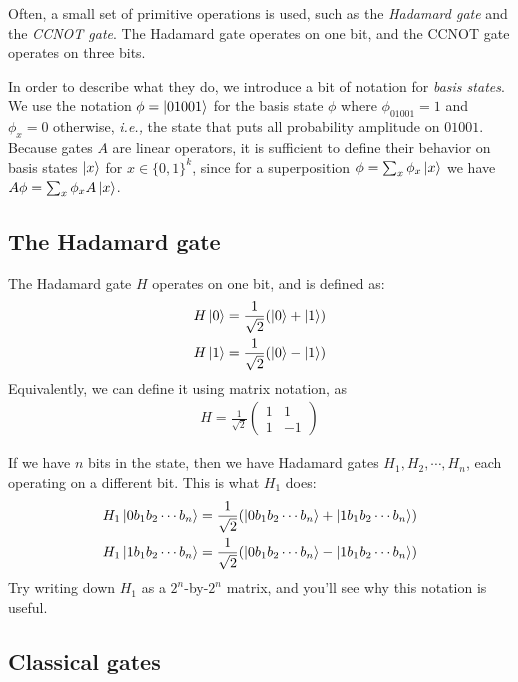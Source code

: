\documentclass[a4paper, 11pt]{article}
\theoremstyle{definition}
\newcommand{\ie}{\textit{i.e.,}\xspace}
\begin{document}
Often, a small set of primitive operations is used, such as the \emph{Hadamard gate} and the \emph{CCNOT gate}.
The Hadamard gate operates on one bit, and the CCNOT gate operates on three bits.

In order to describe what they do, we introduce a bit of notation for \emph{basis states}.
We use the notation $\phi = \ket{01001}$ for the basis state $\phi$ where $\phi_{01001} = 1$ and $\phi_x = 0$ otherwise, \ie the state that puts all probability amplitude on $01001$.
Because gates $A$ are linear operators, it is sufficient to define their behavior on basis states $\ket{x}$ for $x \in \{0,1\}^k$,
since for a superposition $\phi = \sum_x \phi_x \ket{x}$ we have $A\phi = \sum_x \phi_x A \ket{x}$.

\subsection{The Hadamard gate}

\newcommand{\Ha}{H}
\newcommand{\CCNOT}{\mathsf{CCNOT}}

The Hadamard gate $\Ha$ operates on one bit, and is defined as:
\begin{align*}
  \Ha\ket{0} = \frac{1}{\sqrt{2}}(\ket{0} + \ket{1}) \\
  \Ha\ket{1} = \frac{1}{\sqrt{2}}(\ket{0} - \ket{1})
\end{align*}
Equivalently, we can define it using matrix notation, as
\begin{align*}
  \Ha = \frac{1}{\sqrt{2}}\begin{pmatrix}
    1 & 1 \\
    1 & -1
  \end{pmatrix}
\end{align*}

If we have $n$ bits in the state, then we have Hadamard gates $\Ha_1, \Ha_2, \cdots, \Ha_n$, each operating on a different bit.
This is what $\Ha_1$ does:
\begin{align}
  \Ha_1 \ket{0 b_1 b_2 \cdots b_n} = \frac{1}{\sqrt{2}}(\ket{0 b_1 b_2 \cdots b_n} + \ket{1 b_1 b_2 \cdots b_n}) \label{eqn:hadamard}\\
  \Ha_1 \ket{1 b_1 b_2 \cdots b_n} = \frac{1}{\sqrt{2}}(\ket{0 b_1 b_2 \cdots b_n} - \ket{1 b_1 b_2 \cdots b_n})
\end{align}
Try writing down $H_1$ as a $2^n$-by-$2^n$ matrix, and you'll see why this notation is useful.

\subsection{Classical gates}
\end{document}
